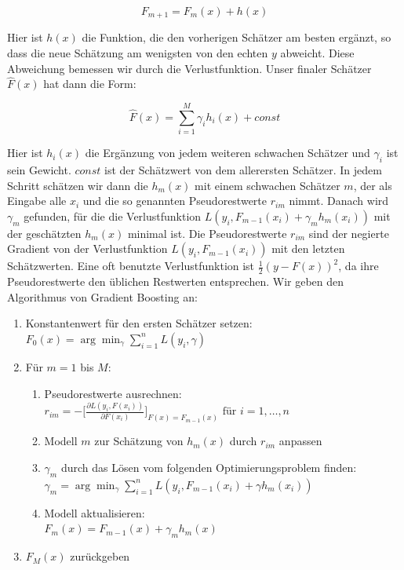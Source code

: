 \documentclass[12pt,a4paper,twoside]{scrartcl}
\numberwithin{equation}{section}
\begin{document}
\begin{equation}\label{eq:2.25}
	F_{m+1} = F_m(x) + h(x)
\end{equation} 

\noindent
Hier ist $h(x)$ die Funktion, die den vorherigen Schätzer am besten ergänzt, so dass die neue Schätzung am wenigsten von den echten $y$ abweicht. Diese Abweichung bemessen wir durch die Verlustfunktion. Unser finaler Schätzer $\hat F(x)$ hat dann die Form: \par 

\begin{equation}\label{eq:2.26}
	\hat F(x) = \sum_{i=1}^{M} \gamma_i h_i(x) + const
\end{equation} 

\noindent
Hier ist $h_i(x)$ die Ergänzung von jedem weiteren schwachen Schätzer und $\gamma_i$ ist sein Gewicht. $const$ ist der Schätzwert von dem allerersten Schätzer. In jedem Schritt schätzen wir dann die $h_m(x)$ mit einem schwachen Schätzer $m$, der als Eingabe alle $x_i$ und die so genannten Pseudorestwerte $r_{im}$ nimmt. Danach wird $\gamma_m$ gefunden, für die die Verlustfunktion $L(y_i,F_{m-1}(x_i)+\gamma_m h_m(x_i))$ mit der geschätzten $h_m(x)$ minimal ist. Die  Pseudorestwerte $r_{im}$ sind der negierte Gradient von der Verlustfunktion  $L(y_i,F_{m-1}(x_i))$ mit den letzten Schätzwerten. Eine oft benutzte Verlustfunktion ist $\frac{1}{2}(y-F(x))^2$, da ihre Pseudorestwerte den üblichen Restwerten entsprechen\cite{gradientBoost}. Wir geben den Algorithmus von Gradient Boosting an:\par 

\begin{enumerate}
\item Konstantenwert für den ersten Schätzer setzen:\\
$F_0(x) = \arg\min_{\gamma} \sum_{i=1}^n L(y_i,\gamma)$
\item Für $m = 1$ bis $M$:
\begin{enumerate}
\item Pseudorestwerte ausrechnen:\\
$r_{im} = - \big [ \frac{\partial L(y_i,F(x_i))}{\partial F(x_i)}\big ]_{F(x)=F_{m-1}(x)} \text{ für } i= 1,\dots,n $
\item Modell $m$ zur Schätzung von $h_m(x)$ durch $r_{im}$ anpassen
\item $\gamma_m$ durch das Lösen vom folgenden Optimierungsproblem finden:\\
$\gamma_m = \arg\min_{\gamma} \sum_{i=1}^n L(y_i,F_{m-1}(x_i)+\gamma h_m(x_i))$
\item Modell aktualisieren:\\
$F_m(x) = F_{m-1}(x) + \gamma_m h_m(x)$	
\end{enumerate}

\item $F_M(x)$ zurückgeben
\end{enumerate}
\end{document}
